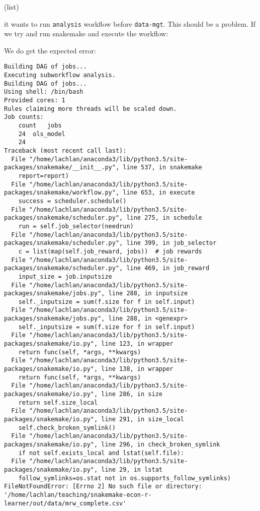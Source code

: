 \documentclass[]{book}
\newenvironment{Shaded}{\begin{snugshade}}{\end{snugshade}}
\newcommand{\KeywordTok}[1]{\textcolor[rgb]{0.13,0.29,0.53}{\textbf{{#1}}}}
\newcommand{\NormalTok}[1]{{#1}}
\theoremstyle{definition}
\theoremstyle{definition}
\theoremstyle{definition}
\theoremstyle{remark}
\begin{document}
(list)

it wants to run \texttt{analysis} workflow before \texttt{data-mgt}.
This should be a problem. If we try and run snakemake and execute the
workflow:

\begin{Shaded}
\end{Shaded}

We do get the expected error:

\begin{verbatim}
Building DAG of jobs...
Executing subworkflow analysis.
Building DAG of jobs...
Using shell: /bin/bash
Provided cores: 1
Rules claiming more threads will be scaled down.
Job counts:
    count   jobs
    24  ols_model
    24
Traceback (most recent call last):
  File "/home/lachlan/anaconda3/lib/python3.5/site-packages/snakemake/__init__.py", line 537, in snakemake
    report=report)
  File "/home/lachlan/anaconda3/lib/python3.5/site-packages/snakemake/workflow.py", line 653, in execute
    success = scheduler.schedule()
  File "/home/lachlan/anaconda3/lib/python3.5/site-packages/snakemake/scheduler.py", line 275, in schedule
    run = self.job_selector(needrun)
  File "/home/lachlan/anaconda3/lib/python3.5/site-packages/snakemake/scheduler.py", line 399, in job_selector
    c = list(map(self.job_reward, jobs))  # job rewards
  File "/home/lachlan/anaconda3/lib/python3.5/site-packages/snakemake/scheduler.py", line 469, in job_reward
    input_size = job.inputsize
  File "/home/lachlan/anaconda3/lib/python3.5/site-packages/snakemake/jobs.py", line 288, in inputsize
    self._inputsize = sum(f.size for f in self.input)
  File "/home/lachlan/anaconda3/lib/python3.5/site-packages/snakemake/jobs.py", line 288, in <genexpr>
    self._inputsize = sum(f.size for f in self.input)
  File "/home/lachlan/anaconda3/lib/python3.5/site-packages/snakemake/io.py", line 123, in wrapper
    return func(self, *args, **kwargs)
  File "/home/lachlan/anaconda3/lib/python3.5/site-packages/snakemake/io.py", line 138, in wrapper
    return func(self, *args, **kwargs)
  File "/home/lachlan/anaconda3/lib/python3.5/site-packages/snakemake/io.py", line 286, in size
    return self.size_local
  File "/home/lachlan/anaconda3/lib/python3.5/site-packages/snakemake/io.py", line 291, in size_local
    self.check_broken_symlink()
  File "/home/lachlan/anaconda3/lib/python3.5/site-packages/snakemake/io.py", line 296, in check_broken_symlink
    if not self.exists_local and lstat(self.file):
  File "/home/lachlan/anaconda3/lib/python3.5/site-packages/snakemake/io.py", line 29, in lstat
    follow_symlinks=os.stat not in os.supports_follow_symlinks)
FileNotFoundError: [Errno 2] No such file or directory: '/home/lachlan/teaching/snakemake-econ-r-learner/out/data/mrw_complete.csv'
\end{verbatim}
\end{document}

